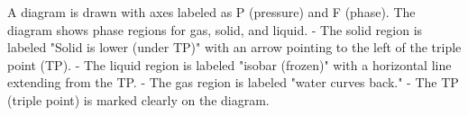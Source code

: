 A diagram is drawn with axes labeled as P (pressure) and F (phase). The diagram shows phase regions for gas, solid, and liquid.  
- The solid region is labeled "Solid is lower (under TP)" with an arrow pointing to the left of the triple point (TP).  
- The liquid region is labeled "isobar (frozen)" with a horizontal line extending from the TP.  
- The gas region is labeled "water curves back."  
- The TP (triple point) is marked clearly on the diagram.